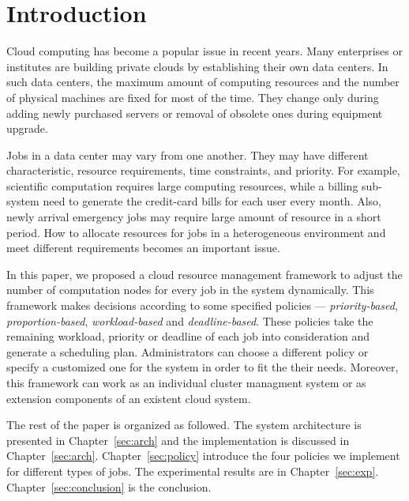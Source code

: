 \chapter{Introduction}\label{sec:intro}

Cloud computing has become a popular issue in recent years.
Many enterprises or institutes are building private clouds by
establishing their own data centers.
In such data centers, the maximum amount of computing resources and the
number of physical machines are fixed for most of the time.
They change only during adding newly purchased servers or removal of
obsolete ones during equipment upgrade.


Jobs in a data center may vary from one another.
They may have different characteristic, resource requirements, time 
constraints, and priority.
For example, scientific computation requires large computing resources,
while a billing sub-system need to generate the credit-card bills for 
each user every month.
Also, newly arrival emergency jobs may require large amount of resource
in a short period.
How to allocate resources for jobs in a heterogeneous environment and
meet different requirements becomes an important issue.

In this paper, we proposed a cloud resource management framework to
adjust the number of computation nodes for every job in the system
dynamically.
This framework makes decisions according to some specified policies ---
\emph{priority-based}, \emph{proportion-based}, \emph{workload-based}
and \emph{deadline-based}.
These policies take the remaining workload, priority or deadline of each
job into consideration and generate a scheduling plan.
Administrators can choose a different policy or specify a customized one
for the system in order to fit the their needs.
Moreover, this framework can work as an individual cluster managment
system or as extension components of an existent cloud system.

The rest of the paper is organized as followed.
The system architecture is presented in Chapter~\ref{sec:arch} and the
implementation is discussed in Chapter~\ref{sec:arch}.
Chapter~\ref{sec:policy} introduce the four policies we implement for 
different types of jobs.
The experimental results are in Chapter~\ref{sec:exp}.
Chapter~\ref{sec:conclusion} is the conclusion.
